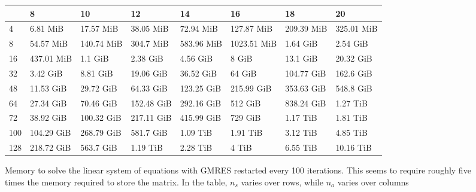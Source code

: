 \begin{sidewaysfigure}
  \centering
  \caption{Memory to solve the linear system of equations with GMRES restarted
every 100 iterations. This seems to require roughly five times the memory required
to store the matrix. In the table, $n_s$ varies over rows, while $n_a$ varies over columns}
  \begin{tabular}{llllllll}
  \toprule
  {} &          8  &          10 &          12 &          14 &           16 &          18 &          20 \\
  \midrule
  4   &    6.81 MiB &   17.57 MiB &   38.05 MiB &   72.94 MiB &   127.87 MiB &  209.39 MiB &  325.01 MiB \\
  8   &   54.57 MiB &  140.74 MiB &   304.7 MiB &  583.96 MiB &  1023.51 MiB &    1.64 GiB &    2.54 GiB \\
  16  &  437.01 MiB &     1.1 GiB &    2.38 GiB &    4.56 GiB &        8 GiB &    13.1 GiB &   20.32 GiB \\
  32  &    3.42 GiB &    8.81 GiB &   19.06 GiB &   36.52 GiB &       64 GiB &  104.77 GiB &   162.6 GiB \\
  48  &   11.53 GiB &   29.72 GiB &   64.33 GiB &  123.25 GiB &   215.99 GiB &  353.63 GiB &   548.8 GiB \\
  64  &   27.34 GiB &   70.46 GiB &  152.48 GiB &  292.16 GiB &      512 GiB &  838.24 GiB &    1.27 TiB \\
  72  &   38.92 GiB &  100.32 GiB &  217.11 GiB &  415.99 GiB &      729 GiB &    1.17 TiB &    1.81 TiB \\
  100 &  104.29 GiB &  268.79 GiB &   581.7 GiB &    1.09 TiB &     1.91 TiB &    3.12 TiB &    4.85 TiB \\
  128 &  218.72 GiB &   563.7 GiB &    1.19 TiB &    2.28 TiB &        4 TiB &    6.55 TiB &   10.16 TiB \\
  \bottomrule
  \end{tabular}
\end{sidewaysfigure}

